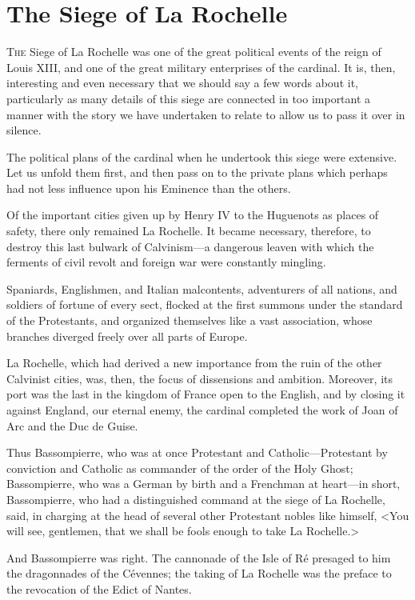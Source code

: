 
\chapter{The Siege of La Rochelle}

\lettrine[]{T}{he} Siege of La Rochelle was one of the great political events of the reign of Louis XIII, and one of the great military enterprises of the cardinal. It is, then, interesting and even necessary that we should say a few words about it, particularly as many details of this siege are connected in too important a manner with the story we have undertaken to relate to allow us to pass it over in silence. 

The political plans of the cardinal when he undertook this siege were extensive. Let us unfold them first, and then pass on to the private plans which perhaps had not less influence upon his Eminence than the others. 

Of the important cities given up by Henry IV to the Huguenots as places of safety, there only remained La Rochelle. It became necessary, therefore, to destroy this last bulwark of Calvinism---a dangerous leaven with which the ferments of civil revolt and foreign war were constantly mingling. 

Spaniards, Englishmen, and Italian malcontents, adventurers of all nations, and soldiers of fortune of every sect, flocked at the first summons under the standard of the Protestants, and organized themselves like a vast association, whose branches diverged freely over all parts of Europe. 

La Rochelle, which had derived a new importance from the ruin of the other Calvinist cities, was, then, the focus of dissensions and ambition. Moreover, its port was the last in the kingdom of France open to the English, and by closing it against England, our eternal enemy, the cardinal completed the work of Joan of Arc and the Duc de Guise. 

Thus Bassompierre, who was at once Protestant and Catholic---Protestant by conviction and Catholic as commander of the order of the Holy Ghost; Bassompierre, who was a German by birth and a Frenchman at heart---in short, Bassompierre, who had a distinguished command at the siege of La Rochelle, said, in charging at the head of several other Protestant nobles like himself, <You will see, gentlemen, that we shall be fools enough to take La Rochelle.> 

And Bassompierre was right. The cannonade of the Isle of Ré presaged to him the dragonnades of the Cévennes; the taking of La Rochelle was the preface to the revocation of the Edict of Nantes. 

